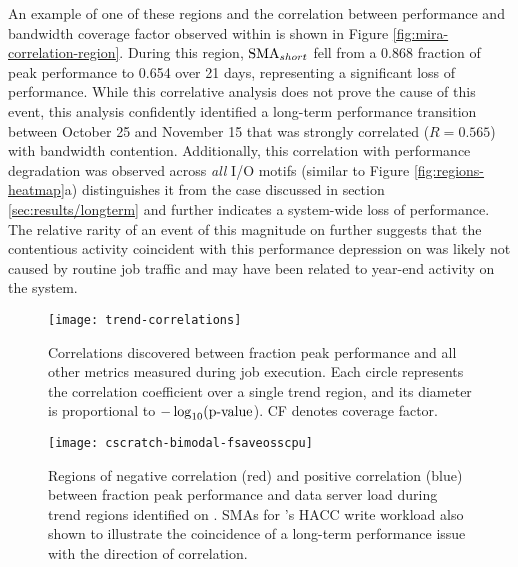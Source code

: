 An example of one of these regions and the correlation between performance and bandwidth coverage factor observed within is shown in Figure \ref{fig:mira-correlation-region}.
During this region, $\textup{SMA}_{short}$ fell from a 0.868 fraction of peak performance to 0.654 over 21 days, representing a significant loss of performance.
While this correlative analysis does not prove the cause of this event, this analysis confidently identified a long-term performance transition between October 25 and November 15 that was strongly correlated ($R = 0.565$) with bandwidth contention.
Additionally, this correlation with performance degradation was observed across \emph{all} I/O motifs (similar to Figure \ref{fig:regions-heatmap}a) distinguishes it from the case discussed in section \ref{sec:results/longterm} and further indicates a system-wide loss of performance.
The relative rarity of an event of this magnitude on \mira further suggests that the contentious activity coincident with this performance depression on \mira was likely not caused by routine job traffic and may have been related to year-end activity on the system.

\begin{figure}
    \centering
    \texttt{[image: trend-correlations]}
    \vspace{-.35in}
    \caption{Correlations discovered between fraction peak performance and all other metrics measured during job execution.
    Each circle represents the correlation coefficient over a single trend region, and its diameter is proportional to $-\log_{10}(\textup{p-value}$).
    CF denotes coverage factor.}
    \label{fig:trend-correlations}
\end{figure}


\begin{figure}
    \centering
    \texttt{[image: cscratch-bimodal-fsaveosscpu]}
    \vspace{-.35in}
    \caption{Regions of negative correlation (red) and positive correlation (blue) between fraction peak performance and data server load during trend regions identified on \cori.
    SMAs for \cori's HACC write workload also shown to illustrate the coincidence of a long-term performance issue with the direction of correlation.}
    \label{fig:cscratch-bimodal-fsaveosscpu}
\end{figure}


